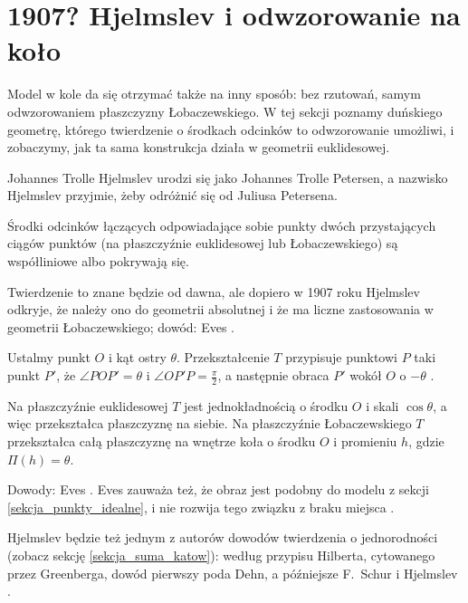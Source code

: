 \section{1907? Hjelmslev i odwzorowanie na koło} %
\label{sekcja_hjelmslev}
Model w kole da się otrzymać także na inny sposób: bez rzutowań, samym odwzorowaniem płaszczyzny Łobaczewskiego. %
W tej sekcji poznamy duńskiego geometrę, którego twierdzenie o środkach odcinków to odwzorowanie umożliwi, i zobaczymy, jak ta sama konstrukcja działa w geometrii euklidesowej. %

Johannes Trolle Hjelmslev urodzi się jako Johannes Trolle Petersen, a nazwisko Hjelmslev przyjmie, żeby odróżnić się od Juliusa Petersena.

\begin{theorem}[Hjelmsleva] %
	Środki odcinków łączących odpowiadające sobie punkty dwóch przystających ciągów punktów (na płaszczyźnie euklidesowej lub Łobaczewskiego) są współliniowe albo pokrywają się. %
\end{theorem}

Twierdzenie to znane będzie od dawna, ale dopiero w 1907 roku Hjelmslev odkryje, że należy ono do geometrii absolutnej i że ma liczne zastosowania w geometrii Łobaczewskiego; dowód: Eves \cite[s. 311--312]{eves1_1972}. %

Ustalmy punkt $O$ i kąt ostry $\theta$. %
Przekształcenie $T$ przypisuje punktowi $P$ taki punkt $P'$, że $\angle POP' = \theta$ i $\angle OP'P = \tfrac{\pi}{2}$, a następnie obraca $P'$ wokół $O$ o $-\theta$ \cite[s. 312]{eves1_1972}. %

\begin{proposition}
	Na płaszczyźnie euklidesowej $T$ jest jednokładnością o środku $O$ i skali $\cos\theta$, a więc przekształca płaszczyznę na siebie. %
	Na płaszczyźnie Łobaczewskiego $T$ przekształca całą płaszczyznę na wnętrze koła o środku $O$ i promieniu $h$, gdzie $\Pi(h) = \theta$. %
\end{proposition}

Dowody: Eves \cite[s. 312--313]{eves1_1972}. %
Eves zauważa też, że obraz jest podobny do modelu z sekcji \ref{sekcja_punkty_idealne}, i nie rozwija tego związku z braku miejsca \cite[s. 313]{eves1_1972}. %

Hjelmslev będzie też jednym z autorów dowodów twierdzenia o jednorodności (zobacz sekcję \ref{sekcja_suma_katow}): według przypisu Hilberta, cytowanego przez Greenberga, dowód pierwszy poda Dehn, a późniejsze F.~Schur i Hjelmslev \cite[s. 208]{greenberg_2010}. %

